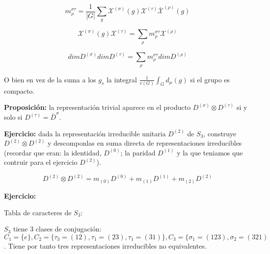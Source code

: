 $$m_\rho ^{\sigma \tau} =\frac{1}{|G|} \sum _g \mathcal{X}^{(\sigma)}(g)\mathcal{X}^{(\tau)}\bar{\mathcal{X}}^{(\rho)}(g)$$

$$\mathcal{X}^{(\sigma)}(g)\mathcal{X}^{(\tau)}= \sum _\rho m_\rho ^{\sigma \tau}\mathcal{X}^{(\rho)}$$

$$dimD^{(\sigma)}dim D^{(\tau)}=\sum _\rho m_\rho ^{\sigma \tau} dimD^{(\rho)}$$

O bien en vez de la suma a los $g_s$ la integral $\frac{1}{v(G)}\int _G d_\mu (g)$ si el grupo es compacto.

\smallskip
\textbf{Proposición:} la representación trivial aparece en el producto $D^{(\sigma)}\otimes D^{(\tau)}$ si y solo si $D^{(\tau)}= \bar{D}^{\sigma}$.

\smallskip
\textbf{Ejercicio:} dada la representación irreducible unitaria $D^{(2)}$ de $S_3$, construye $D^{(2)}\otimes D^{(2)}$ y descomponlas en suma directa de representaciones irreducibles (recordar que eran: la identidad, $D^{(0)}$; la paridad $D^{(1)}$ y la que teniamos que contruir para el ejercicio $D^{(2)}$).

$$D^{(2)}\otimes D^{(2)}=m_{(0)}D^{(0)}+m_{(1)}D^{(1)}+m_{(2)}D^{(2)}$$

\textbf{Ejercicio:}

\smallskip
Tabla de caracteres de $S_3$:

\smallskip
$S_3$ tiene 3 clases de conjugación: $C_1=\lbrace e \rbrace, C_2= \lbrace \tau _3=(12),\tau _1=(23), \tau _1=(31)\rbrace, C_3=\lbrace \sigma _1=(123),\sigma _2=(321)$. Tiene por tanto tres representaciones irreducibles no equivalentes.


